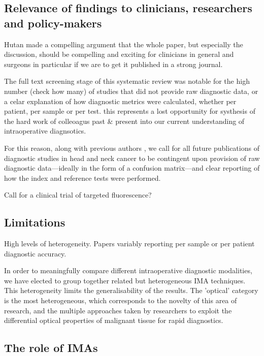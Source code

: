 \subsection{Relevance of findings to clinicians, researchers and policy-makers}

Hutan made a compelling argument that the whole paper, but especially the discussion, should be compelling and exciting for clinicians in general and surgeons in particular if we are to get it published in a strong journal.

The full text screening stage of this systematic review was notable for the high number (check how many) of studies that did not provide raw diagnostic data, or a celar explanation of how diagnostic metrics were calculated, whether per patient, per sample or per test.
this represents a lost opportunity for systhesis of the hard work of colleoagus past \& present into our current understanding of intraoperative diagnsotics.

For this reason, along with previous authors \cite{stjohnDiagnosticAccuracyIntraoperative2017, irwigGuidelinesMetaanalysesEvaluating1994}, we call for all future publications of diagnostic studies in head and neck cancer to be contingent upon provision of raw diagnostic data---ideally in the form of a confusion matrix---and clear reporting of how the index and reference tests were performed.

Call for a clinical trial of targeted fluorescence?

\subsection{Limitations}

High levels of heterogeneity.
Papers variably reporting per sample or per patient diagnostic accuracy.

In order to meaningfully compare different intraoperative diagnostic modalities, we have elected to group together related but heterogeneous IMA techniques. 
This heterogeneity limits the generalisability of the results.
The 'optical' category is the most heterogeneous, which corresponds to the novelty of this area of research, and the multiple approaches taken by researchers to exploit the differential optical properties of malignant tissue for rapid diagnostics.


\subsection{The role of IMAs}

